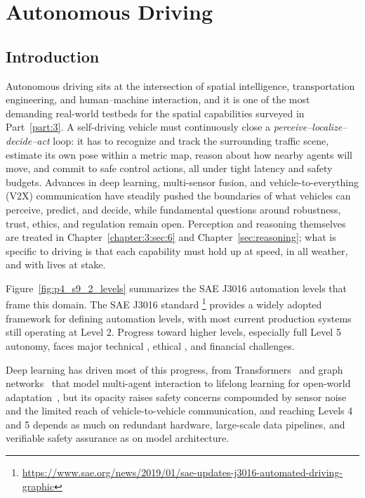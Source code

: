 \section{Autonomous Driving}
\label{sec:p4_s9_2}



\subsection{Introduction}
\label{subsec:p4-sec9-2-introduction}
Autonomous driving sits at the intersection of spatial intelligence, transportation engineering, and human--machine interaction, and it is one of the most demanding real-world testbeds for the spatial capabilities surveyed in Part~\ref{part:3}.
A self-driving vehicle must continuously close a \emph{perceive--localize--decide--act} loop: it has to recognize and track the surrounding traffic scene, estimate its own pose within a metric map, reason about how nearby agents will move, and commit to safe control actions, all under tight latency and safety budgets.
Advances in deep learning, multi-sensor fusion, and vehicle-to-everything (V2X) communication have steadily pushed the boundaries of what vehicles can perceive, predict, and decide, while fundamental questions around robustness, trust, ethics, and regulation remain open.
Perception and reasoning themselves are treated in Chapter~\ref{chapter:3:sec:6} and Chapter~\ref{sec:reasoning}; what is specific to driving is that each capability must hold up at speed, in all weather, and with lives at stake.

Figure~\ref{fig:p4_s9_2_levels} summarizes the SAE J3016 automation levels that frame this domain.
The SAE J3016 standard \footnote{\url{https://www.sae.org/news/2019/01/sae-updates-j3016-automated-driving-graphic}} provides a widely adopted framework for defining automation levels, with most current production systems still operating at Level 2.
Progress toward higher levels, especially full Level 5 autonomy, faces major technical \cite{YurtseverLCT20}, ethical \cite{StahlTM16}, and financial \cite{fisher2020governmental} challenges.



Deep learning has driven most of this progress, from Transformers~\cite{WangLLLXLCLZH22} and graph networks~\cite{ZhangFWH22} that model multi-agent interaction to lifelong learning for open-world adaptation~\cite{ZhuBZZW24}, but its opacity raises safety concerns compounded by sensor noise and the limited reach of vehicle-to-vehicle communication, and reaching Levels 4 and 5 depends as much on redundant hardware, large-scale data pipelines, and verifiable safety assurance as on model architecture.


